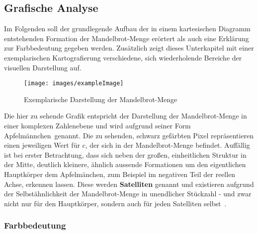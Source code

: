 \subsection{Grafische Analyse}\label{subsec:graphical-analysis}

Im Folgenden soll der grundlegende Aufbau der in einem kartesischen Diagramm
entstehenden Formation der Mandelbrot-Menge erörtert als auch eine
Erklärung zur Farbbedeutung gegeben werden.
Zusätzlich zeigt dieses Unterkapitel mit einer exemplarischen Kartografierung
verschiedene, sich wiederholende Bereiche der visuellen Darstellung auf.

\bigskip
\begin{figure}[h!]
  \centering
  \texttt{[image: images/exampleImage]}
  \caption[Caption for LOF]{
    Exemplarische Darstellung der Mandelbrot-Menge\footnotemark
  }
  \label{fig:mandelbrot-set}
\end{figure}

Die hier zu sehende Grafik entspricht der Darstellung der Mandelbrot-Menge
in einer komplexen Zahlenebene und wird aufgrund seiner Form
\glqq Apfelm\"annchen\grqq~genannt.
Die zu sehenden, schwarz gefärbten Pixel repräsentieren einen
jeweiligen Wert für $c$, der sich in der Mandelbrot-Menge befindet.
Auffällig ist bei erster Betrachtung, dass sich neben der großen,
einheitlichen Struktur in der Mitte,
deutlich kleinere, ähnlich aussende Formationen um den eigentlichen Hauptkörper
dem Apfelm\"anchen, zum Beispiel im negativen Teil der reellen Achse,
erkennen lassen.
Diese werden \textbf{Satelliten} genannt und existieren aufgrund der Selbstähnlichkeit
der Mandelbrot-Menge in unendlicher Stückzahl - und zwar nicht nur für den Hauptkörper,
sondern auch für jeden Satelliten selbst~\cite{lomonaco_quasi-conformal_2018}.

\subsubsection{Farbbedeutung}

